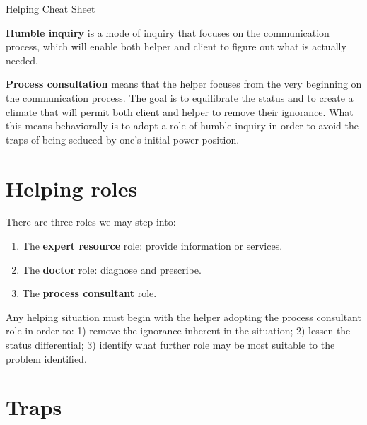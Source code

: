 \documentclass{article}
\newenvironment{nosepenumerate}
{ \begin{enumerate}
    \setlength{\itemsep}{0pt}
    \setlength{\parskip}{0pt}
    \setlength{\parsep}{0pt}     }
{ \end{enumerate}                  }
\begin{document}
\begin{center}
     \Large{{Helping Cheat Sheet}}
\end{center}

\begin{multicols}{2}

\noindent
\textbf{Humble inquiry} is a mode of inquiry that focuses on the communication process, which will enable both helper and client to figure out what is actually needed.

\textbf{Process consultation} means that the helper focuses from the very beginning on the communication process. The goal is to equilibrate the status and to create a climate that will permit both client and helper to remove their ignorance. What this means behaviorally is to adopt a role of humble inquiry in order to avoid the traps of being seduced by one's initial power position.

\end{multicols}

\section{Helping roles}

\begin{multicols}{2}

\noindent
There are three roles we may step into:

\begin{nosepenumerate}
    \item The \textbf{expert resource} role: provide information or services.
    \item The \textbf{doctor} role: diagnose and prescribe.
    \item The \textbf{process consultant} role.
\end{nosepenumerate}

Any helping situation must begin with the helper adopting the process consultant role in order to: 1) remove the ignorance inherent in the situation; 2) lessen the status differential; 3) identify what further role may be most suitable to the problem identified.

\end{multicols}

\section{Traps}
\end{document}
